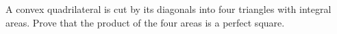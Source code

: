 A convex quadrilateral is cut by its diagonals into four triangles with integral areas. Prove that the product of the four areas is a perfect square.

